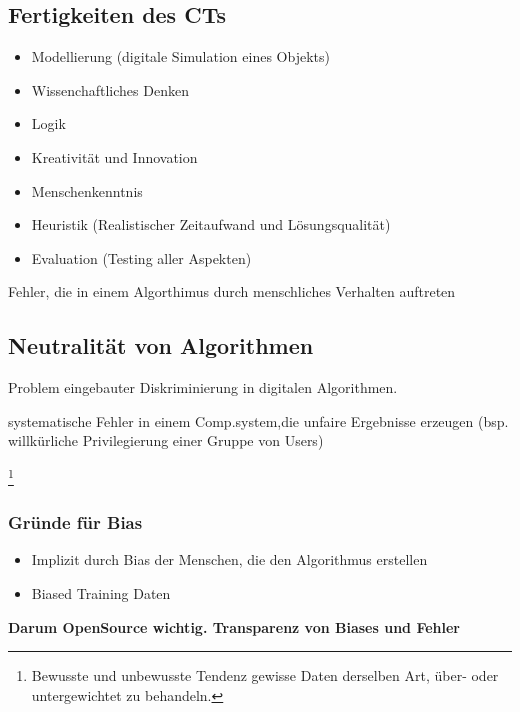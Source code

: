 \subsection{Fertigkeiten des CTs}
\begin{itemize}
    \item Modellierung (digitale Simulation eines Objekts)
    \item Wissenchaftliches Denken 
    \item Logik
    \item Kreativität und Innovation
    \item Menschenkenntnis
    \item Heuristik (Realistischer Zeitaufwand und Lösungsqualität)
    \item Evaluation (Testing aller Aspekten)
\end{itemize}

\begin{definition}
     Fehler, die in einem Algorthimus durch menschliches Verhalten auftreten 
\end{definition}

\subsection{Neutralität von Algorithmen}

Problem eingebauter Diskriminierung in digitalen Algorithmen. 

\begin{definition}
     systematische Fehler in einem Comp.system,die unfaire Ergebnisse erzeugen (bsp. willkürliche Privilegierung einer Gruppe von Users)
\end{definition} \footnote{Bewusste und unbewusste Tendenz gewisse Daten derselben Art, über- oder untergewichtet zu behandeln.}

\subsubsection{Gründe für Bias}
\begin{itemize}
    \item Implizit durch Bias der Menschen, die den Algorithmus erstellen
    \item Biased Training Daten
\end{itemize}

\textbf{Darum OpenSource wichtig. Transparenz von Biases und Fehler}
